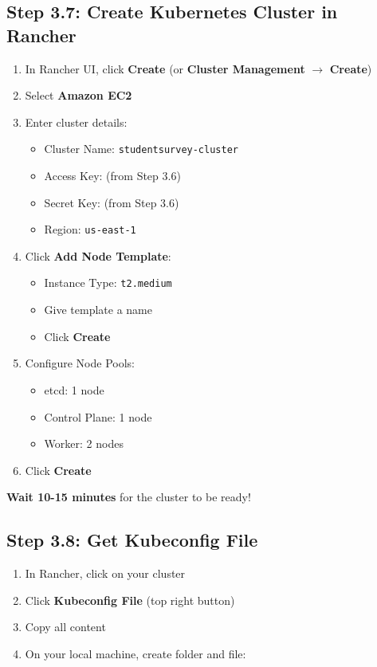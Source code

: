 \documentclass[12pt,a4paper]{article}
\begin{document}
\subsection{Step 3.7: Create Kubernetes Cluster in Rancher}

\begin{enumerate}
    \item In Rancher UI, click \textbf{Create} (or \textbf{Cluster Management} $\rightarrow$ \textbf{Create})
    \item Select \textbf{Amazon EC2}
    \item Enter cluster details:
    \begin{itemize}
        \item Cluster Name: \texttt{studentsurvey-cluster}
        \item Access Key: (from Step 3.6)
        \item Secret Key: (from Step 3.6)
        \item Region: \texttt{us-east-1}
    \end{itemize}
    \item Click \textbf{Add Node Template}:
    \begin{itemize}
        \item Instance Type: \texttt{t2.medium}
        \item Give template a name
        \item Click \textbf{Create}
    \end{itemize}
    \item Configure Node Pools:
    \begin{itemize}
        \item etcd: 1 node
        \item Control Plane: 1 node
        \item Worker: 2 nodes
    \end{itemize}
    \item Click \textbf{Create}
\end{enumerate}

\textbf{Wait 10-15 minutes} for the cluster to be ready!

\subsection{Step 3.8: Get Kubeconfig File}

\begin{enumerate}
    \item In Rancher, click on your cluster
    \item Click \textbf{Kubeconfig File} (top right button)
    \item Copy all content
    \item On your local machine, create folder and file:
\end{enumerate}
\end{document}
